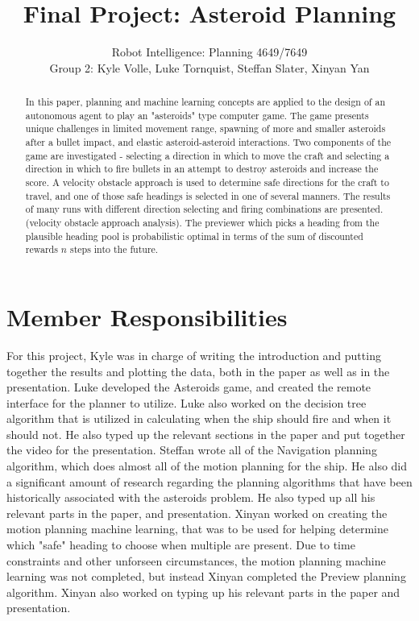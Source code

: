 \documentclass[10pt,final,conference]{IEEEtran}
\begin{document}
\title{Final Project: Asteroid Planning}
\author{Robot Intelligence: Planning 4649/7649 \\
Group 2: Kyle Volle, Luke Tornquist, Steffan Slater, Xinyan Yan}
\maketitle


\newpage

\nocite{*}

\begin{abstract}
In this paper, planning and machine learning concepts are applied to the design of an autonomous agent to play an "asteroids" type computer game. The game presents unique challenges in limited movement range, spawning of more and smaller asteroids after a bullet impact, and elastic asteroid-asteroid interactions. Two components of the game are investigated - selecting a direction in which to move the craft and selecting a direction in which to fire bullets in an attempt to destroy asteroids and increase the score. A velocity obstacle approach is used to determine safe directions for the craft to travel, and one of those safe headings is selected in one of several manners. The results of many runs with different direction selecting and firing combinations are presented. (velocity obstacle approach analysis). The previewer which picks a heading from the plausible heading pool is probabilistic optimal in terms of the sum of discounted rewards $n$ steps into the future.  

\end{abstract}

\section{Member Responsibilities}
For this project, Kyle was in charge of writing the introduction and putting together the results and plotting the data, both in the paper as well as in the presentation.  Luke developed the Asteroids game, and created the remote interface for the planner to utilize.  Luke also worked on the decision tree algorithm that is utilized in calculating when the ship should fire and when it should not.  He also typed up the relevant sections in the paper and put together the video for the presentation.  Steffan wrote all of the Navigation planning algorithm, which does almost all of the motion planning for the ship.  He also did a significant amount of research regarding the planning algorithms that have been historically associated with the asteroids problem.  He also typed up all his relevant parts in the paper, and presentation.  Xinyan worked on creating the motion planning machine learning, that was to be used for helping determine which "safe" heading to choose when multiple are present.  Due to time constraints and other unforseen circumstances, the motion planning machine learning was not completed, but instead Xinyan completed the Preview planning algorithm.  Xinyan also worked on typing up his relevant parts in the paper and presentation.
\end{document}
